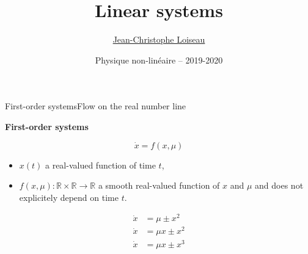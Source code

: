 \documentclass[usenames,dvipsnames,svgnames,10pt,aspectratio=169]{beamer}
\title[Nonlinear physics] %
{
	Linear systems
}
\author[J.-Ch.~Loiseau] %
{
	\underline{Jean-Christophe Loiseau}
}
\institute[unused]
{
	\url{jean-christophe.loiseau@ensam.eu} \\
	Laboratoire DynFluid \\
	Arts et M\'etiers, France.
}
\date[unused]{Physique non-lin\'eaire -- 2019-2020}
\begin{document}
\titleframe	%


\begin{frame}[t, c]{First-order systems}{Flow on the real number line}
  \begin{minipage}{.48\textwidth}
    \begin{block}{\centering \textbf{First-order systems}}

    \[ \dot{x} = f(x, \mu) \]
    \end{block}

    \medskip

    \begin{itemize}
    \item $x(t)$ a real-valued function of time $t$,

      \medskip

    \item $f(x, \mu) : \mathbb{R} \times \mathbb{R} \to \mathbb{R}$ a smooth real-valued function of $x$ and $\mu$ and does not explicitely depend on time $t$.
    \end{itemize}
  \end{minipage}%
  \hfill
  \begin{minipage}{.48\textwidth}
    \[
    \begin{aligned}
      \dot{x} & = \mu \pm x^2 \\
      \dot{x} & = \mu x \pm x^2 \\
      \dot{x} & = \mu x \pm x^3 \\
    \end{aligned}
    \]
  \end{minipage}

  \vspace{1cm}
\end{frame}
\end{document}

